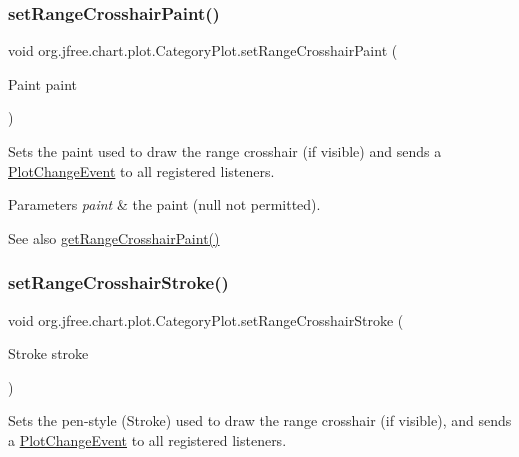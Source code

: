 \subsubsection{\texorpdfstring{set\+Range\+Crosshair\+Paint()}{setRangeCrosshairPaint()}}
{\footnotesize\ttfamily void org.\+jfree.\+chart.\+plot.\+Category\+Plot.\+set\+Range\+Crosshair\+Paint (\begin{DoxyParamCaption}\item[{Paint}]{paint }\end{DoxyParamCaption})}

Sets the paint used to draw the range crosshair (if visible) and sends a \mbox{\hyperlink{}{Plot\+Change\+Event}} to all registered listeners.


\begin{DoxyParams}{Parameters}
{\em paint} & the paint ({\ttfamily null} not permitted).\\
\hline
\end{DoxyParams}
\begin{DoxySeeAlso}{See also}
\mbox{\hyperlink{classorg_1_1jfree_1_1chart_1_1plot_1_1_category_plot_a765b9210a12e1f9374c252a5736a659a}{get\+Range\+Crosshair\+Paint()}} 
\end{DoxySeeAlso}
\mbox{\label{classorg_1_1jfree_1_1chart_1_1plot_1_1_category_plot_a10aa9ae7d091bb3c83d7634d1c9696c6}} 
\subsubsection{\texorpdfstring{set\+Range\+Crosshair\+Stroke()}{setRangeCrosshairStroke()}}
{\footnotesize\ttfamily void org.\+jfree.\+chart.\+plot.\+Category\+Plot.\+set\+Range\+Crosshair\+Stroke (\begin{DoxyParamCaption}\item[{Stroke}]{stroke }\end{DoxyParamCaption})}

Sets the pen-\/style ({\ttfamily Stroke}) used to draw the range crosshair (if visible), and sends a \mbox{\hyperlink{}{Plot\+Change\+Event}} to all registered listeners.


